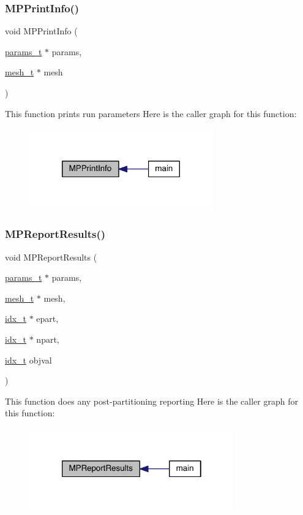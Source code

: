 \subsubsection{\texorpdfstring{M\+P\+Print\+Info()}{MPPrintInfo()}}
{\footnotesize\ttfamily void M\+P\+Print\+Info (\begin{DoxyParamCaption}\item[{\hyperlink{a00706}{params\+\_\+t} $\ast$}]{params,  }\item[{\hyperlink{a00738}{mesh\+\_\+t} $\ast$}]{mesh }\end{DoxyParamCaption})}

This function prints run parameters Here is the caller graph for this function\+:\nopagebreak
\begin{figure}[H]
\begin{center}
\leavevmode
\includegraphics[width=224pt]{a00323_a921bb5a29825f90d7095365cc3e92bdc_icgraph}
\end{center}
\end{figure}
\mbox{\label{a00323_ab030933d65b9043991ac35e28a0a6df0}} 
\subsubsection{\texorpdfstring{M\+P\+Report\+Results()}{MPReportResults()}}
{\footnotesize\ttfamily void M\+P\+Report\+Results (\begin{DoxyParamCaption}\item[{\hyperlink{a00706}{params\+\_\+t} $\ast$}]{params,  }\item[{\hyperlink{a00738}{mesh\+\_\+t} $\ast$}]{mesh,  }\item[{\hyperlink{a00876_aaa5262be3e700770163401acb0150f52}{idx\+\_\+t} $\ast$}]{epart,  }\item[{\hyperlink{a00876_aaa5262be3e700770163401acb0150f52}{idx\+\_\+t} $\ast$}]{npart,  }\item[{\hyperlink{a00876_aaa5262be3e700770163401acb0150f52}{idx\+\_\+t}}]{objval }\end{DoxyParamCaption})}

This function does any post-\/partitioning reporting Here is the caller graph for this function\+:\nopagebreak
\begin{figure}[H]
\begin{center}
\leavevmode
\includegraphics[width=250pt]{a00323_ab030933d65b9043991ac35e28a0a6df0_icgraph}
\end{center}
\end{figure}
